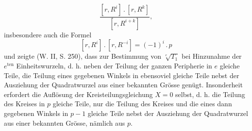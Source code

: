 \[
\frac{[r,R^i]\mathbin{.}[r,R^k]}{[r,R^{i+k}]},
\]
insbesondere auch die Formel
\[
[r,R^i]\mathbin{.}[r,R^{-i}]=(-1)^i\mathbin{.}p
\]
und zeigte (W. II, S. 250), dass zur Bestimmung von \(\sqrt[e]{T_1}\) bei Hinzunahme der \(e^{\mathrm{ten}}\) Einheitswurzeln, d. h. neben der Teilung der ganzen Peripherie in \(e\) gleiche Teile, die Teilung eines gegebenen Winkels in ebensoviel gleiche Teile
\newpage{}
\noindent nebst der Ausziehung der Quadratwurzel aus einer bekannten Grösse genügt. Insonderheit erfordert die Auflösung der Kreisteilungsgleichung \(X=0\) selbst, d. h. die Teilung des Kreises in \(p\) gleiche Teile, nur die Teilung des Kreises und die eines dann gegebenen Winkels in \(p-1\) gleiche Teile nebst der Ausziehung der Quadratwurzel aus einer bekannten Grösse, nämlich aus \(p\).

